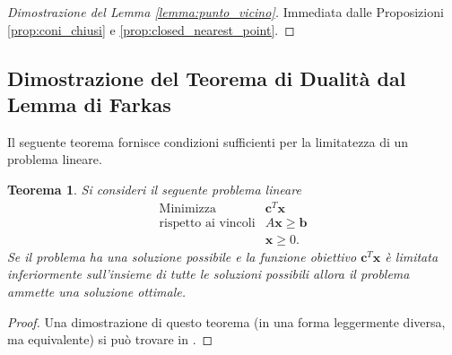 \documentclass[italian, letter paper, 12pt, reqno]{article}
\theoremstyle{myteo}
\newtheorem{theorem}{Teorema}[section]
\numberwithin{equation}{section}
\begin{document}
\begin{proof}[Dimostrazione del Lemma \ref{lemma:punto_vicino}]
  Immediata dalle Proposizioni \ref{prop:coni_chiusi} e \ref{prop:closed_nearest_point}.
\end{proof}

\subsection{Dimostrazione del Teorema di Dualità dal Lemma di Farkas}
\label{subsec:dim_dualità}

Il seguente teorema fornisce condizioni sufficienti per la limitatezza di un problema lineare.

\begin{theorem}
  \label{teo:condizioni_sufficienti}
  Si consideri il seguente problema lineare
  \begin{equation*}
    \begin{array}{ll}
      \text{Minimizza} & \mathbf{c}^T\mathbf{x}\\
      \text{rispetto ai vincoli} & A\mathbf{x} \ge \mathbf{b}\\
                        & \mathbf{x} \ge 0.
    \end{array}
  \end{equation*}
  Se il problema ha una soluzione possibile e la funzione obiettivo \(\mathbf{c}^T\mathbf{x}\) è limitata \emph{inferiormente} sull'insieme di tutte le soluzioni possibili allora il problema ammette una soluzione ottimale.
\end{theorem}

\begin{proof}
  Una dimostrazione di questo teorema (in una forma leggermente diversa, ma equivalente) si può trovare in \cite[Theorem 4.2.3]{understanding_linear_programming}.
\end{proof}
\end{document}
